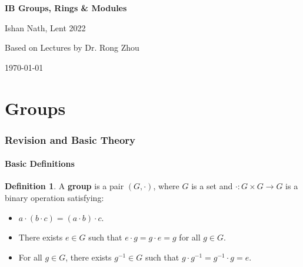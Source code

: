 \documentclass[12pt]{article}
\theoremstyle{definition}
\newtheorem{definition}{Definition}[section]
\theoremstyle{remark}
\begin{document}
\hypersetup{pageanchor=false}
\begin{titlepage}
	\begin{center}
		\vspace*{1em}
		\Huge
		\textbf{IB Groups, Rings \& Modules}

		\vspace{1em}
		\large
		Ishan Nath, Lent 2022

		\vspace{1.5em}

		\Large

		Based on Lectures by Dr. Rong Zhou

		\vspace{1em}

		\large
		\today
	\end{center}
	
\end{titlepage}
\hypersetup{pageanchor=true}

\tableofcontents

\newpage

\part{Groups}%
\label{prt:groups}

\section{Revision and Basic Theory}%
\label{sec:revision_and_basic_theory}

\subsection{Basic Definitions}%
\label{sub:basic_definitions_groups}

\begin{definition}
	A \textbf{group} is a pair $(G, \cdot)$, where $G$ is a set and $\cdot : G \times G \to G$ is a binary operation satisfying:
	\begin{itemize}
		\item $a \cdot (b \cdot c) = (a \cdot b) \cdot c$.
		\item There exists $e \in G$ such that $e \cdot g = g \cdot e = g$ for all $g \in G$.
		\item For all $g \in G$, there exists $g^{-1} \in G$ such that $g \cdot g^{-1} =  g^{-1} \cdot g = e$.
	\end{itemize}
\end{definition}
\end{document}
